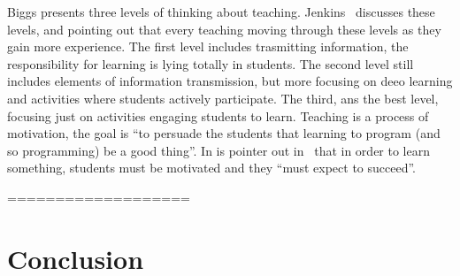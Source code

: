 \documentclass{article}
\begin{document}
Biggs presents three levels of thinking about teaching.
Jenkins~\cite{journey_Jenkins} discusses these levels, and pointing
out that every teaching moving through these levels as they gain more
experience. The first level includes trasmitting information, the
responsibility for learning is lying totally in students.  The second
level still includes elements of information transmission, but more
focusing on deeo learning and activities where students actively
participate.  The third, ans the best level, focusing just on
activities engaging students to learn. Teaching is a process of
motivation, the goal is ``to persuade the students that learning to
program (and so programming) be a good thing''. In is pointer out
in~\cite{journey_Jenkins} that in order to learn something, students
must be motivated and they ``must expect to succeed''.






===================










\section{Conclusion} %
\label{sec:conclusion}




\end{document}
